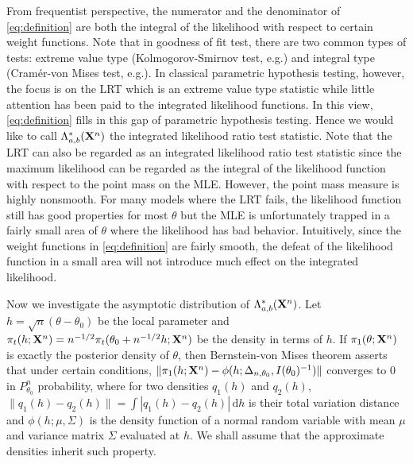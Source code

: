 \documentclass[11pt]{article}
\theoremstyle{plain}
\theoremstyle{definition}
\theoremstyle{remark}
\begin{document}
From frequentist perspective, the numerator and the denominator of \eqref{eq:definition} are both the integral of the likelihood with respect to certain weight functions.
Note that in goodness of fit test, there are two common types of tests: extreme value type (Kolmogorov-Smirnov test, e.g.) and integral type (Cram\'er-von Mises test, e.g.).
In classical parametric hypothesis testing, however, the focus is on the LRT which is an extreme value type statistic while little attention has been paid to the integrated likelihood functions.
In this view, \eqref{eq:definition} fills in this gap of parametric hypothesis testing.
Hence we would like to call $\Lambda_{a,b}^*(\mathbf{X}^n )$ the integrated likelihood ratio test statistic.
Note that the LRT can also be regarded as an integrated likelihood ratio test statistic since the maximum likelihood can be regarded as the integral of the likelihood function with respect to the point mass on the MLE.
However, the point mass measure is highly nonsmooth.
For many models where the LRT fails, the likelihood function still has good properties for most $\theta$ but the MLE is unfortunately trapped in a fairly small area of $\theta$ where the likelihood has bad behavior.
Intuitively, since the weight functions in \eqref{eq:definition} are fairly smooth,
the defeat of the likelihood function in a small area will not introduce much effect on the integrated likelihood.



Now we investigate the asymptotic distribution of $\Lambda_{a,b}^*(\mathbf{X}^n)$.
Let $h=\sqrt{n}(\theta-\theta_0)$ be the local parameter and $\pi_t (h;\mathbf{X}^{n}) = n^{-1/2} \pi_t(\theta_0+n^{-1/2}h;\mathbf{X}^{n})$ be the density in terms of $h$.
If $\pi_1(\theta;\mathbf{X}^{n})$ is exactly the posterior density of $\theta$, then Bernstein-von Mises theorem asserts that under certain conditions,
$
            \|\pi_1(h;\mathbf{X}^{n})-\phi(h;\Delta_{n,\theta_0},I(\theta_0)^{-1})\|
$
converges to $0$ in $P_{\theta_0}^n$ probability,
where for two densities $q_1(h)$ and $q_2(h)$, $\|q_1(h)-q_2(h)\|=\int |q_1(h)-q_2(h)|\, \mathrm d h$ is their total variation distance and $\phi(h; \mu ,\Sigma)$ is the density function of a normal random variable with mean $\mu$ and variance matrix $\Sigma$ evaluated at $h$.
We shall assume that the approximate densities inherit such property.
        
\end{document}
